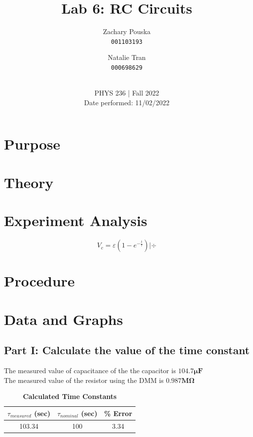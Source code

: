 \documentclass[titlepage]{article}
\begin{document}
\title{\textbf{Lab 6: RC Circuits}}
\author{
    Zachary Pouska\\
    \texttt{001103193}\\
    \and
    Natalie Tran \\ 
    \texttt{000698629}\\ \\
} 

\date{PHYS 236 | Fall 2022\\
Date performed: 11/02/2022}


	\maketitle



	\section{Purpose}
	\section{Theory}	
	\section{Experiment Analysis}


    $$V_c = \varepsilon \left( 1- e^{-\frac{t}{\tau}} \right)  | \div $$
    



	\section{Procedure}




	\section{Data and Graphs}
	\subsection{Part I: Calculate the value of the time constant}
		The measured value of capacitance of the the capacitor is
		\(\mathbf{ 104.7\pmb{\mu} F }\) \\
		The measured value of the resistor using the DMM is
	\(\pmb{0.987 M\Omega} \)
		\begin{table}[ht!]
			\caption*{\textbf{Calculated Time Constants}}
			\centering
			\begin{tabular}{c|c|c}
				$\tau_{measured}$ (sec) & $\tau_{nominal}$ (sec) & \% Error \\
				\hline
				103.34 & 100 & 3.34
			\end{tabular}
		\end{table}
\end{document}
